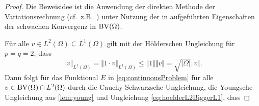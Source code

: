 \begin{proof}
  Die Beweisidee ist die Anwendung der direkten Methode der Variationsrechnung
  (cf.\ z.B.\ \cite{Dac89}) unter Nutzung der in 
  aufgeführten Eigenschaften der schwachen Konvergenz in $\textup{BV}(\Omega)$.

  Für alle $v\in L^2(\Omega)\subseteq L^1(\Omega)$ gilt mit der Hölderschen
  Ungleichung für $p=q=2$, dass
  \begin{equation}\label{eq:hoelderL2BiggerL1}
    \Vert v\Vert_{L^1(\Omega)} 
    = \Vert 1\cdot v\Vert_{L^1(\Omega)}
    \leq \Vert 1\Vert\Vert v\Vert
    =\sqrt{|\Omega|} \Vert v\Vert.
  \end{equation}
  Dann folgt für das Funktional $E$ in \eqref{eq:continuousProblem} für alle
  $v\in \textup{BV}(\Omega)\cap L^2(\Omega)$ durch die Cauchy-Schwarzsche Ungleichung,
  die Youngsche Ungleichung aus \cref{lem:young} und Ungleichung
  \eqref{eq:hoelderL2BiggerL1}, dass


\end{proof}
